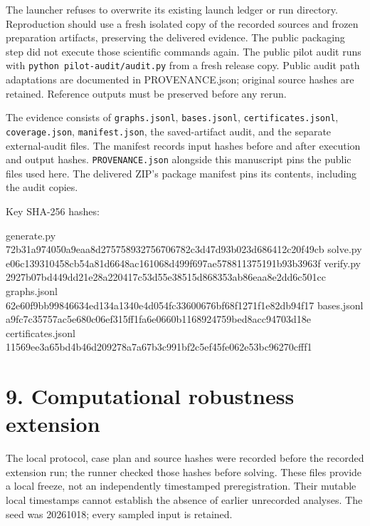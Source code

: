 \documentclass[
]{article}
\newenvironment{Shaded}{}{}
\newcommand{\NormalTok}[1]{#1}
\begin{document}
The launcher refuses to overwrite its existing launch ledger or run
directory. Reproduction should use a fresh isolated copy of the recorded
sources and frozen preparation artifacts, preserving the delivered
evidence. The public packaging step did not execute those scientific
commands again. The public pilot audit runs with
\texttt{python\ pilot-audit/audit.py} from a fresh release copy. Public
audit path adaptations are documented in PROVENANCE.json; original
source hashes are retained. Reference outputs must be preserved before
any rerun.

The evidence consists of \texttt{graphs.jsonl}, \texttt{bases.jsonl},
\texttt{certificates.jsonl}, \texttt{coverage.json},
\texttt{manifest.json}, the saved-artifact audit, and the separate
external-audit files. The manifest records input hashes before and after
execution and output hashes. \texttt{PROVENANCE.json} alongside this
manuscript pins the public files used here. The delivered ZIP's package
manifest pins its contents, including the audit copies.

Key SHA-256 hashes:

\begin{Shaded}
\begin{Highlighting}[]
\NormalTok{generate.py  72b31a974050a9eaa8d275758932756706782c3d47d93b023d686412c20f49cb}
\NormalTok{solve.py     e06c139310458cb54a81d6648ac161068d499f697ae578811375191b93b3963f}
\NormalTok{verify.py    2927b07bd449dd21e28a220417c53d55e38515d868353ab86eaa8e2dd6c501cc}
\NormalTok{graphs.jsonl 62e60f9bb99846634ed134a1340e4d054fc33600676bf68f1271f1e82db94f17}
\NormalTok{bases.jsonl  a9fc7c35757ac5e680c06ef315ff1fa6e0660b1168924759bed8acc94703d18e}
\NormalTok{certificates.jsonl}
\NormalTok{11569ee3a65bd4b46d209278a7a67b3c991bf2c5ef45fe062e53bc96270cfff1}
\end{Highlighting}
\end{Shaded}

\section{9. Computational robustness
extension}\label{computational-robustness-extension}

The local protocol, case plan and source hashes were recorded before the
recorded extension run; the runner checked those hashes before solving.
These files provide a local freeze, not an independently timestamped
preregistration. Their mutable local timestamps cannot establish the
absence of earlier unrecorded analyses. The seed was 20261018; every
sampled input is retained.
\end{document}

